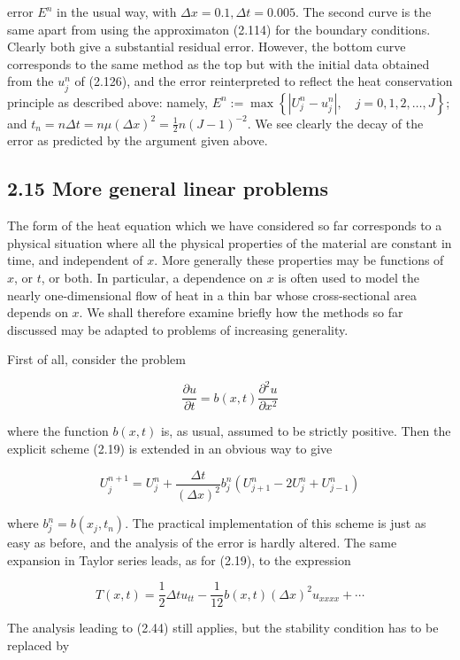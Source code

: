 \documentclass[10pt]{article}
\begin{document}
error \(E^{n}\) in the usual way, with \(\Delta x=0.1, \Delta t=0.005\). The second curve is the same apart from using the approximaton (2.114) for the boundary conditions. Clearly both give a substantial residual error. However, the bottom curve corresponds to the same method as the top but with the initial data obtained from the \(u_{j}^{n}\) of (2.126), and the error reinterpreted to reflect the heat conservation principle as described above: namely, \(E^{n}:=\max \left\{\left|U_{j}^{n}-u_{j}^{n}\right|, \quad j=0,1,2, \ldots, J\right\}\); and \(t_{n}=n \Delta t=n \mu(\Delta x)^{2}= \frac{1}{2} n(J-1)^{-2}\). We see clearly the decay of the error as predicted by the argument given above.

\subsection*{2.15 More general linear problems}
The form of the heat equation which we have considered so far corresponds to a physical situation where all the physical properties of the material are constant in time, and independent of \(x\). More generally these properties may be functions of \(x\), or \(t\), or both. In particular, a dependence on \(x\) is often used to model the nearly one-dimensional flow of heat in a thin bar whose cross-sectional area depends on \(x\). We shall therefore examine briefly how the methods so far discussed may be adapted to problems of increasing generality.

First of all, consider the problem

\[
\frac{\partial u}{\partial t}=b(x, t) \frac{\partial^{2} u}{\partial x^{2}}
\]

where the function \(b(x, t)\) is, as usual, assumed to be strictly positive. Then the explicit scheme (2.19) is extended in an obvious way to give

\[
U_{j}^{n+1}=U_{j}^{n}+\frac{\Delta t}{(\Delta x)^{2}} b_{j}^{n}\left(U_{j+1}^{n}-2 U_{j}^{n}+U_{j-1}^{n}\right)
\]

where \(b_{j}^{n}=b\left(x_{j}, t_{n}\right)\). The practical implementation of this scheme is just as easy as before, and the analysis of the error is hardly altered. The same expansion in Taylor series leads, as for (2.19), to the expression

\[
T(x, t)=\frac{1}{2} \Delta t u_{t t}-\frac{1}{12} b(x, t)(\Delta x)^{2} u_{x x x x}+\cdots
\]

The analysis leading to (2.44) still applies, but the stability condition has to be replaced by
\end{document}
